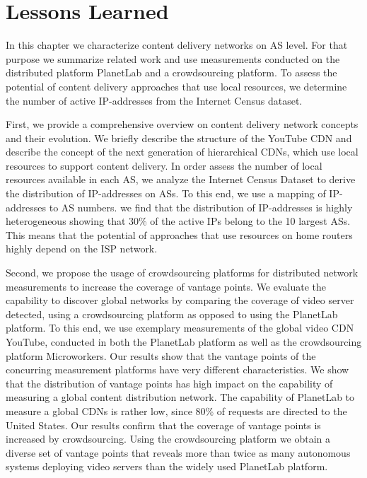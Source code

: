 \section{Lessons Learned}\label{sec:aslevel:lessons_learned}
In this chapter we characterize content delivery networks on AS level. %
For that purpose we summarize related work and use measurements conducted on the distributed platform PlanetLab and a crowdsourcing platform.
To assess the potential of content delivery approaches that use local resources, we determine the number of active IP-addresses from the Internet Census dataset.

First, we provide a comprehensive overview on content delivery network concepts and their evolution. We briefly describe the structure of the YouTube CDN and describe the concept of the next generation of hierarchical CDNs, which use local resources to support content delivery.
In order assess the number of local resources available in each AS, we analyze the Internet Census Dataset to derive the distribution of IP-addresses on ASs.
To this end, we use a mapping of IP-addresses to AS numbers.
we find that the distribution of IP-addresses is highly heterogeneous showing that 30\% of the active IPs belong to the 10 largest ASs.
This means that the potential of approaches that use resources on home routers highly depend on the ISP network.

Second, we propose the usage of crowdsourcing platforms for distributed network measurements to increase the coverage of vantage points.
We evaluate the capability to discover global networks by comparing the coverage of video server detected, using a crowdsourcing platform as opposed to using the PlanetLab platform.
To this end, we use exemplary measurements of the global video CDN YouTube, conducted in both the PlanetLab platform as well as the crowdsourcing platform Microworkers.
Our results show that the vantage points of the concurring measurement platforms have very different characteristics.
We show that the distribution of vantage points has high impact on the capability of measuring a global content distribution network.
The capability of PlanetLab to measure a global CDNs is rather low, since 80\% of requests are directed to the United States.
Our results confirm that the coverage of vantage points is increased by crowdsourcing.
Using the crowdsourcing platform we obtain a diverse set of vantage points that reveals more than twice as many autonomous systems deploying video servers than the widely used PlanetLab platform.

